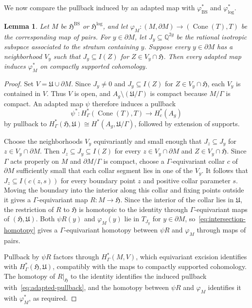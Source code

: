 \documentclass[12 pt]{amsart}
\newcommand{\fH}{\mathfrak H}
\newcommand{\fU}{\mathfrak U}
\newcommand{\QQ}{\mathbb{Q}}
\newcommand{\BS}{\mathrm{BS}}
\newcommand{\Cone}{\operatorname{Cone}}
\newcommand{\<}{\langle}
\renewcommand{\>}{\rangle}
\newtheorem{lemma}[theorem]{Lemma}
\theoremstyle{definition}
\begin{document}
We now compare the pullback induced by an adapted map with $\varphi_{\BS}^*$ and $\varphi_{\log}^*$.

\begin{lemma}\label{lem:adapted-boundary-comparison}
Let $M$ be $\fH^{\BS}$ or $\fH^{\log}$, and let $\varphi_M \colon (M, \partial M) \to (\Cone(T), T)$ be the corresponding map of pairs. For $y \in \partial M$, let $J_y \subseteq \QQ^{2g}$ be the rational isotropic subspace associated to the stratum containing $y$. Suppose every $y \in \partial M$ has a neighborhood $V_y$ such that $J_y \subseteq I(Z)$ for $Z \in V_y \cap \fH$. Then every adapted map induces $\varphi_M^*$ on compactly supported cohomology.
\end{lemma}

\begin{proof}
Set $V = \fU \cup \partial M$. Since $J_y \ne 0$ and $J_y \subseteq I(Z)$ for $Z \in V_y \cap \fH$, each $V_y$ is contained in $V$. Thus $V$ is open, and $A_g \setminus (\fU/\Gamma)$ is compact because $M/\Gamma$ is compact. An adapted map $\psi$ therefore induces a pullback
\begin{equation}\label{eq:adapted-pullback}
\psi^* \colon H_\Gamma^*(\Cone(T), T) \longrightarrow H_c^*(A_g)
\end{equation}
by pullback to $H_\Gamma^*(\fH, \fU) \cong H^*(A_g, \fU/\Gamma)$, followed by extension of supports.

Choose the neighborhoods $V_y$ equivariantly and small enough that $J_z \subseteq J_y$ for $z \in V_y \cap \partial M$. Then $J_z \subseteq J_y \subseteq I(Z)$ for every $z \in V_y \cap \partial M$ and $Z \in V_y \cap \fH$. Since $\Gamma$ acts properly on $M$ and $\partial M/\Gamma$ is compact, choose a $\Gamma$-equivariant collar $c$ of $\partial M$ sufficiently small that each collar segment lies in one of the $V_y$. It follows that $J_z \subseteq I(c(z, s))$ for every boundary point $z$ and positive collar parameter $s$. Moving the boundary into the interior along this collar and fixing points outside it gives a $\Gamma$-equivariant map $R \colon M \to \fH$. Since the interior of the collar lies in $\fU$, the restriction of $R$ to $\fH$ is homotopic to the identity through $\Gamma$-equivariant maps of $(\fH, \fU)$. Both $\psi R(y)$ and $\varphi_M(y)$ lie in $T_{J_y}$ for $y \in \partial M$, so~\eqref{eq:intersection-homotopy} gives a $\Gamma$-equivariant homotopy between $\psi R$ and $\varphi_M$ through maps of pairs.

Pullback by $\psi R$ factors through $H_\Gamma^*(M, V)$, which equivariant excision identifies with $H_\Gamma^*(\fH, \fU)$, compatibly with the maps to compactly supported cohomology. The homotopy of $R|_{\fH}$ to the identity identifies the induced pullback with~\eqref{eq:adapted-pullback}, and the homotopy between $\psi R$ and $\varphi_M$ identifies it with $\varphi_M^*$, as required.
\end{proof}
\end{document}
